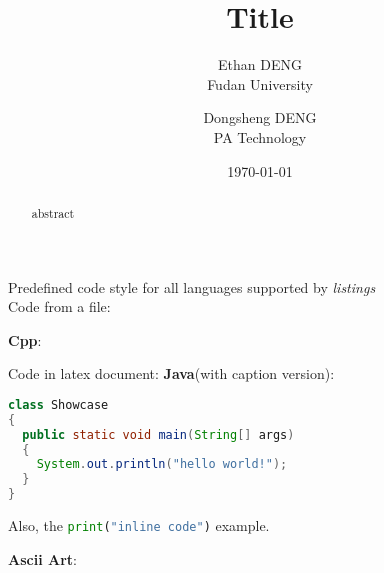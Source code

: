 \documentclass[lang=en,a4paper,bibtex]{elegantcs}
\title{Title}
\author{Ethan DENG \\ Fudan University \and Dongsheng DENG \\ PA Technology}
\institute{Your Institute}
\date{\today} %
\begin{document}
\maketitle
\begin{abstract}
abstract
\end{abstract}

Predefined code style for all languages supported by \textit{listings}\\
Code from a file:

\textbf{Cpp}:

Code in latex document:
\textbf{Java}(with caption version):
\begin{lstlisting}[language=Java, caption={Showcase.java}]
class Showcase
{
  public static void main(String[] args)
  {
    System.out.println("hello world!");
  }
}
\end{lstlisting}

Also, the \lstinline[language=Python]|print("inline code")| example.

\textbf{Ascii Art}:
\setmonofont{Quivira}



\end{document}
